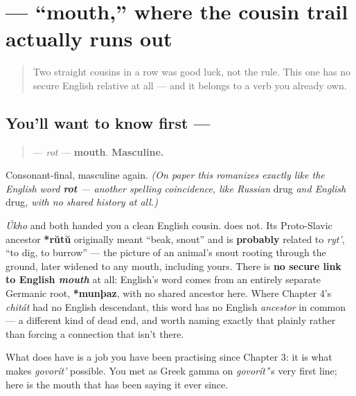 \section[\texorpdfstring{\ru{рот} (rot)}{рот (rot)}]{ — \textquotedblleft{}mouth,\textquotedblright{} where the cousin trail actually runs out}

\label{lesson:RU-C09-rot}



\begin{quote}
Two straight cousins in a row was good luck, not the rule. This one has no secure English relative at all — and it belongs to a verb you already own.
\end{quote}

\subsection*{You'll want to know first — }
\begin{quote}
\textbf{} — \emph{rot} — \textbf{mouth}. \textbf{Masculine.}
\end{quote}

Consonant-final, masculine again. \emph{(On paper this romanizes exactly like the English word \textbf{rot} — another spelling coincidence, like Russian }drug\emph{ and English }drug\emph{, with no shared history at all.)}

\begin{cousinweb}
\emph{Úkho} and \emph{} both handed you a clean English cousin. \textbf{} does not. Its Proto-Slavic ancestor \textbf{*rŭtŭ} originally meant \textquotedblleft{}beak, snout\textquotedblright{} and is \textbf{probably} related to \emph{ryt'}, \textquotedblleft{}to dig, to burrow\textquotedblright{} — the picture of an animal's snout rooting through the ground, later widened to any mouth, including yours. There is \textbf{no secure link to English \emph{mouth}} at all: English's word comes from an entirely separate Germanic root, \textbf{*munþaz}, with no shared ancestor here. Where Chapter 4's \emph{chitát} had no English descendant, this word has no English \emph{ancestor} in common — a different kind of dead end, and worth naming exactly that plainly rather than forcing a connection that isn't there.

What \emph{} does have is a job you have been practising since Chapter 3: it is what makes \emph{govorít'} possible. You met \textbf{} as Greek gamma on \emph{govorít'}'s very first line; here is the mouth that has been saying it ever since.
\end{cousinweb}

